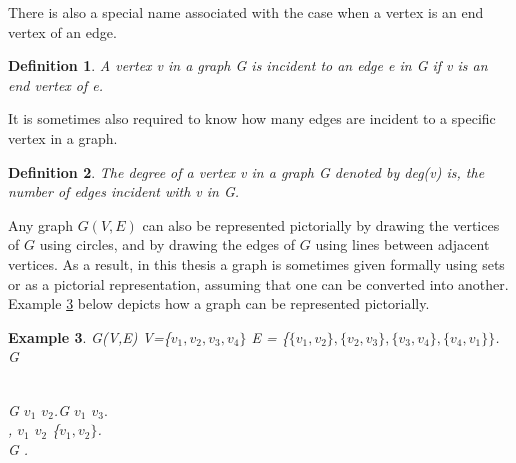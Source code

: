 \documentclass{article}
\newtheorem{definition}{Definition}[subsection]
\newtheorem{example}[definition]{Example}
\begin{document}
There is also a special name associated with the case when a vertex is an end vertex of an edge.
\begin{definition}
\label{incident}
A vertex v in a graph G is incident to an edge e in G if v is an end vertex of e. {}
\end{definition}
It is sometimes also required to know how many edges are incident to a specific vertex in a graph.
\begin{definition}
\label{degree}
The degree of a vertex v in a graph G denoted by deg(v) is, the number of edges incident with v in G. {}
\end{definition}
Any graph $\mathit{G(V,E)}$ can also be represented pictorially by drawing the vertices of $\mathit{G}$ using circles, and by drawing the edges of $\mathit{G}$ using lines between adjacent vertices. As a result, in this thesis a graph is sometimes given formally using sets or as a pictorial representation, assuming that one can be converted into another. Example \ref{Example 1} below depicts how a graph can be represented pictorially.
\begin{example}
\label{Example 1}
{} G(V,E) {}  V=\{$v_1, v_2, v_3, v_4\}$ {} E = \{$\{v_1, v_2\}, \{v_2,v_3\}, \{v_3,v_4\}, \{v_4,v_1\}\}$.\\{} G {}\\

\\
{}G {} $v_1$ {} $v_2$.{}G {} $v_1$ {} $v_3.$\\ {}, $v_1$ {} $v_2$ {} \{$v_1, v_2\}$.\\
{} G {}.
\end{example}
\end{document}
